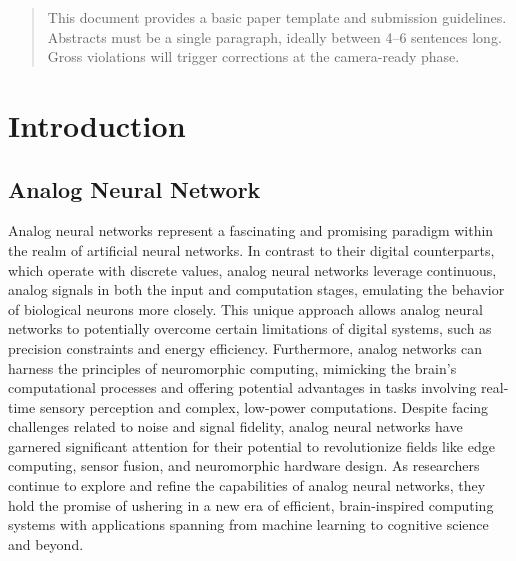 \documentclass[nohyperref]{article}
\theoremstyle{plain}
\theoremstyle{definition}
\theoremstyle{remark}
\begin{document}
\printAffiliationsAndNotice{}  %

\begin{abstract}
This document provides a basic paper template and submission guidelines.
Abstracts must be a single paragraph, ideally between 4--6 sentences long.
Gross violations will trigger corrections at the camera-ready phase.
\end{abstract}

\section{Introduction}
\subsection{Analog Neural Network}
Analog neural networks represent a fascinating and promising paradigm within the realm of artificial neural networks. In contrast to their digital counterparts, which operate with discrete values, analog neural networks leverage continuous, analog signals in both the input and computation stages, emulating the behavior of biological neurons more closely. This unique approach allows analog neural networks to potentially overcome certain limitations of digital systems, such as precision constraints and energy efficiency. Furthermore, analog networks can harness the principles of neuromorphic computing, mimicking the brain's computational processes and offering potential advantages in tasks involving real-time sensory perception and complex, low-power computations. Despite facing challenges related to noise and signal fidelity, analog neural networks have garnered significant attention for their potential to revolutionize fields like edge computing, sensor fusion, and neuromorphic hardware design. As researchers continue to explore and refine the capabilities of analog neural networks, they hold the promise of ushering in a new era of efficient, brain-inspired computing systems with applications spanning from machine learning to cognitive science and beyond.
\end{document}
